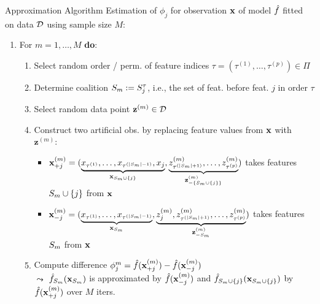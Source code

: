 \documentclass[11pt,compress,t,notes=noshow, aspectratio=169, xcolor=table]{beamer}
\begin{document}
\begin{frame}{Approximation Algorithm }
Estimation of $\phi_j$ for observation $\xv$ of model $\fh$ fitted on data $\D$ using sample size $M$:
  \begin{enumerate}[<+->]
      \item For $m = 1, \ldots, M$ \textbf{do}:
      \begin{enumerate}
        \item Select random order / perm. of feature indices $\tau = (\tau^{(1)}, \ldots, \tau^{(p)}) \in \Pi$
        \item Determine coalition $\Sm := \Stau$, i.e., the set of feat. before feat. $j$ in order $\tau$
        \item Select random data point $\mathbf{z}^{(m)} \in \D$%
        \item Construct two artificial obs. by replacing feature values from $\xv$ with $\mathbf{z}^{(m)}$:
          \begin{itemize}
          \setlength\itemsep{.5em}
            \item %
            $ \xjp  = (\underbrace{x_{\tau^{(1)}}, \ldots, x_{\tau^{(|\Sm|-1)}}, x_{j}}_{\xv_{\Smj}}, \underbrace{z_{\tau^{(|\Sm|+1)}}^{(m)} , \ldots, z_{\tau^{(p)}}^{(m)}}_{\mathbf{z}^{(m)}_{\minusSmj}} )$
            takes features $\Smj$ from $\xv$
            \item %
            $ \xjm = (\underbrace{x_{\tau^{(1)}}, \ldots, x_{\tau^{(|\Sm|-1)}}}_{\xv_{\Sm}}, \underbrace{z_{j}^{(m)} , z_{\tau^{(|\Sm|+1)}}^{(m)} , \ldots, z_{\tau^{(p)}}^{(m)}}_{\mathbf{z}^{(m)}_{-\Sm}} )$
            takes features $\Sm$ from $\xv$
          \end{itemize}
        \item Compute difference $\phi_j^m = \fh(\xjp) - \fh(\xjm)$ \\
        $\leadsto$ $\fh_{\Sm}(\xv_{\Sm})$ is approximated by $\fh(\xv_{-j}^{(m)})$ and  $\fh_{\Smj}(\xv_{\Smj})$ by  $\fh(\xv_{+j}^{(m)})$ over $M$ iters.
        \end{enumerate}
        

\end{enumerate}
\end{frame}
\end{document}
